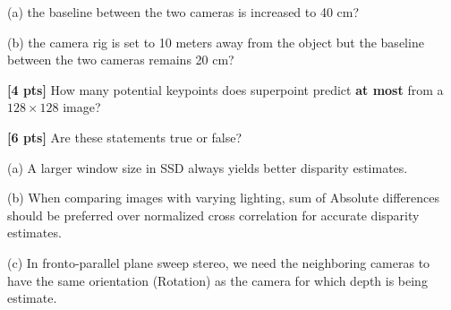 \begin{questions}
    (a) the baseline between the two cameras is increased to 40 cm?

    \begin{tcolorbox}[fit,height=8cm, width=\textwidth, blank, borderline={0.5pt}{-2pt},halign=left, valign=center, nobeforeafter]


    \end{tcolorbox}

    (b) the camera rig is set to 10 meters away from the object but the baseline between the two cameras remains 20 cm?

    \begin{tcolorbox}[fit,height fill, width=\textwidth, blank, borderline={0.5pt}{-2pt},halign=left, valign=center, nobeforeafter]

    \end{tcolorbox}

    \question \textbf{[4 pts]} How many potential keypoints does superpoint predict \textbf{at most} from a $128\times128$ image?

    \begin{tcolorbox}[fit,height=5cm, width=\textwidth, blank, borderline={0.5pt}{-2pt},halign=left, valign=center, nobeforeafter]


    \end{tcolorbox}
    
 \question \textbf{[6 pts]} Are these statements true or false?

    (a) A larger window size in SSD always yields better disparity estimates.

    \begin{tcolorbox}[fit,height=4cm, width=\textwidth, blank, borderline={0.5pt}{-2pt},halign=left, valign=center, nobeforeafter]


    \end{tcolorbox}

    (b) When comparing images with varying lighting, sum of Absolute differences should be preferred over normalized cross correlation for accurate disparity estimates.

    \begin{tcolorbox}[fit,height=4cm, width=\textwidth, blank, borderline={0.5pt}{-2pt},halign=left, valign=center, nobeforeafter]
 
    \end{tcolorbox}


    (c)  In fronto-parallel plane sweep stereo, we need the neighboring cameras to have the same orientation (Rotation) as the camera for which depth is being estimate.


\end{questions}
